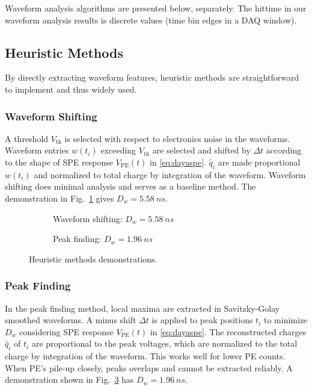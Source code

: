Waveform analysis algorithms are presented below, separately. The hittime in our waveform analysis results is discrete values (time bin edges in a DAQ window). 

\subsection{Heuristic Methods}
By directly extracting waveform features, heuristic methods are straightforward to implement and thus widely used. 

\subsubsection{Waveform Shifting}
\label{sec:shifting}
A threshold $V_\mathrm{th}$ is selected with respect to electronics noise in the waveforms. Waveform entries $w(t_i)$ exceeding $V_\mathrm{th}$ are selected and shifted by $\Delta t$ according to the shape of SPE response $V_\mathrm{PE}(t)$ in \eqref{eq:dayaspe}. $\hat{q}_i$ are made proportional $w(t_i)$ and normalized to total charge by integration of the waveform.  Waveform shifting does minimal analysis and serves as a baseline method.  The demonstration in Fig.~\ref{fig:shifting} gives $D_w = \SI{5.58}{ns}$.

\begin{figure}[H]
  \begin{subfigure}{0.5\textwidth}
    \centering
    \scalebox{0.36}{}
    \caption{\label{fig:shifting}Waveform shifting: $D_w = \SI{5.58}{ns}$}
  \end{subfigure}
  \begin{subfigure}{0.5\textwidth}
    \centering
    \scalebox{0.36}{}
    \caption{\label{fig:peak}Peak finding: $D_w = \SI{1.96}{ns}$}
  \end{subfigure}
  \caption{Heuristic methods demonstrations.}
\end{figure}

\subsubsection{Peak Finding}
\label{sec:findpeak}

In the peak finding method, local maxima are extracted in Savitzky-Golay smoothed waveforms.  A minus shift $\Delta t$ is applied to peak positions $t_i$ to minimize $D_w$ considering SPE response $V_\mathrm{PE}(t)$ in \eqref{eq:dayaspe}. The reconstructed charges $\hat{q}_i$ of $t_i$ are proportional to the peak voltages, which are normalized to the total charge by integration of the waveform.  This works well for lower PE counts. When PE's pile-up closely, peaks overlaps and cannot be extracted reliably. A demonstration shown in Fig.~\ref{fig:peak} has $D_w = \SI{1.96}{ns}$. 

